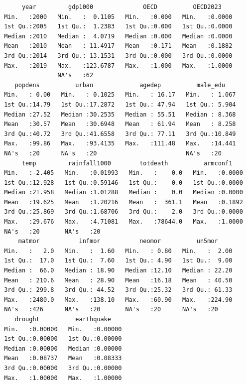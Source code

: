 \documentclass[
  letterpaper,
  DIV=11,
  numbers=noendperiod]{scrartcl}
\begin{document}
\begin{verbatim}
      year         gdp1000              OECD          OECD2023     
 Min.   :2000   Min.   :  0.1105   Min.   :0.000   Min.   :0.0000  
 1st Qu.:2005   1st Qu.:  1.2383   1st Qu.:0.000   1st Qu.:0.0000  
 Median :2010   Median :  4.0719   Median :0.000   Median :0.0000  
 Mean   :2010   Mean   : 11.4917   Mean   :0.171   Mean   :0.1882  
 3rd Qu.:2014   3rd Qu.: 13.1531   3rd Qu.:0.000   3rd Qu.:0.0000  
 Max.   :2019   Max.   :123.6787   Max.   :1.000   Max.   :1.0000  
                NA's   :62                                         
    popdens          urban             agedep          male_edu     
 Min.   : 0.00   Min.   : 0.1025   Min.   : 16.17   Min.   : 1.067  
 1st Qu.:14.79   1st Qu.:17.2872   1st Qu.: 47.94   1st Qu.: 5.904  
 Median :27.52   Median :30.2535   Median : 55.51   Median : 8.368  
 Mean   :30.57   Mean   :30.6948   Mean   : 61.94   Mean   : 8.258  
 3rd Qu.:40.72   3rd Qu.:41.6558   3rd Qu.: 77.11   3rd Qu.:10.849  
 Max.   :99.86   Max.   :93.4135   Max.   :111.48   Max.   :14.441  
 NA's   :20      NA's   :20                         NA's   :20      
      temp         rainfall1000        totdeath          armconf1     
 Min.   :-2.405   Min.   :0.01993   Min.   :    0.0   Min.   :0.0000  
 1st Qu.:12.928   1st Qu.:0.59146   1st Qu.:    0.0   1st Qu.:0.0000  
 Median :21.958   Median :1.01288   Median :    0.0   Median :0.0000  
 Mean   :19.625   Mean   :1.20216   Mean   :  361.1   Mean   :0.1892  
 3rd Qu.:25.869   3rd Qu.:1.68706   3rd Qu.:    2.0   3rd Qu.:0.0000  
 Max.   :29.676   Max.   :4.71081   Max.   :78644.0   Max.   :1.0000  
 NA's   :20       NA's   :20                                          
     matmor           infmor           neomor          un5mor      
 Min.   :   2.0   Min.   :  1.60   Min.   : 0.80   Min.   :  2.00  
 1st Qu.:  17.0   1st Qu.:  7.60   1st Qu.: 4.90   1st Qu.:  9.00  
 Median :  66.0   Median : 18.90   Median :12.10   Median : 22.20  
 Mean   : 210.6   Mean   : 28.90   Mean   :16.18   Mean   : 40.50  
 3rd Qu.: 299.8   3rd Qu.: 44.52   3rd Qu.:25.32   3rd Qu.: 61.33  
 Max.   :2480.0   Max.   :138.10   Max.   :60.90   Max.   :224.90  
 NA's   :426      NA's   :20       NA's   :20      NA's   :20      
    drought          earthquake     
 Min.   :0.00000   Min.   :0.00000  
 1st Qu.:0.00000   1st Qu.:0.00000  
 Median :0.00000   Median :0.00000  
 Mean   :0.08737   Mean   :0.08333  
 3rd Qu.:0.00000   3rd Qu.:0.00000  
 Max.   :1.00000   Max.   :1.00000  
                                    
\end{verbatim}
\end{document}
